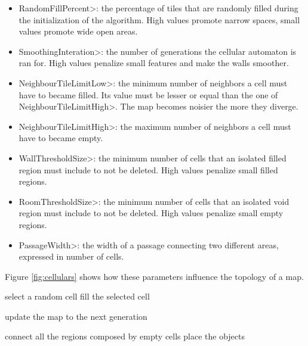 \begin{itemize}
\item \<RandomFillPercent>: the percentage of tiles that are randomly filled during the initialization of the algorithm. High values promote narrow spaces, small values promote wide open areas.
\item \<SmoothingInteration>: the number of generations the cellular automaton is ran for. High values penalize small features and make the walls smoother. 
\item \<NeighbourTileLimitLow>: the minimum number of neighbors a cell must have to became filled. Its value must be lesser or equal than the one of \<NeighbourTileLimitHigh>. The map becomes noisier the more they diverge.
\item \<NeighbourTileLimitHigh>: the maximum number of neighbors a cell must have to became empty.
\item \<WallThresholdSize>: the minimum number of cells that an isolated filled region must include to not be deleted. High values penalize small filled regions.
\item \<RoomThresholdSize>: the minimum number of cells that an isolated void region must include to not be deleted. High values penalize small empty regions.
\item \<PassageWidth>: the width of a passage connecting two different areas, expressed in number of cells.
\end{itemize}

Figure \ref{fig:cellulars} shows how these parameters influence the topology of a map.

\begin{algorithm}[tp]
\SetAlgoLined
\caption{Cellular generation algorithm.}
\label{alg:cellular}


 {
	select a random cell\;
	fill the selected cell\;
}

 {
	update the map to the next generation\;
}



connect all the regions composed by empty cells\;
place the objects\;

\end{algorithm}

